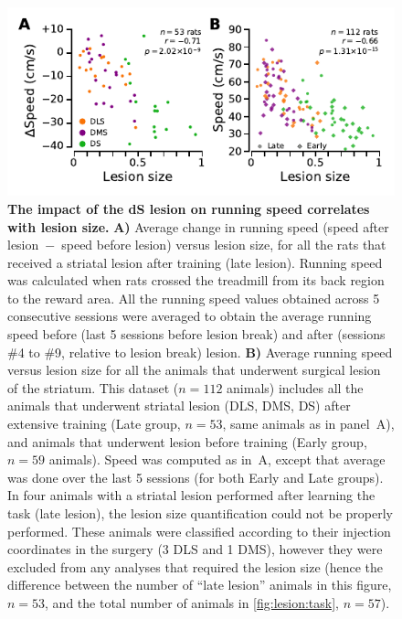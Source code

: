 \begin{figure}[h!]
    \begin{center}
        \includegraphics[scale=1]{ch-appendicies/figures/Speed.pdf}
        \caption[Speed-Lesion Size Correlation]
        {\textbf{The impact of the dS lesion on running speed correlates with lesion size.}
        \textbf{A)} Average change in running speed (speed after lesion~$-$~speed before lesion) versus lesion size, for all the rats that received a striatal lesion after training (late lesion).
        Running speed was calculated when rats crossed the treadmill from its back region to the reward area.
        All the running speed values obtained across 5 consecutive sessions were averaged to obtain the average running speed before (last 5 sessions before lesion break) and after (sessions \#4 to \#9, relative to lesion break) lesion.
        \textbf{B)} Average running speed versus lesion size for all the animals that underwent surgical lesion of the striatum.
        This dataset ($n=112$ animals) includes all the animals that underwent striatal lesion (DLS, DMS, DS) after extensive training (Late group, $n=53$, same animals as in panel~A), and animals that underwent lesion before training (Early group, $n=59$ animals).
        Speed was computed as in~A, except that average was done over the last 5 sessions (for both Early and Late groups).
        In four animals with a striatal lesion performed after learning the task (late lesion), the lesion size quantification could not be properly performed.
        These animals were classified according to their injection coordinates in the surgery (3 DLS and 1 DMS), however they were excluded from any analyses that required the lesion size (hence the difference between the number of ``late lesion'' animals in this figure, $n=53$, and the total number of animals in \autoref{fig:lesion:task}, $n=57$).
        }
        \label{fig:appendix:spd}
    \end{center}
\end{figure}